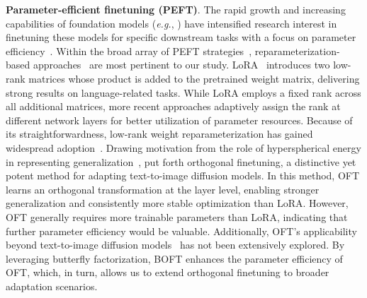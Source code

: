 \textbf{Parameter-efficient finetuning (PEFT)}. The rapid growth and increasing capabilities of foundation models (\emph{e.g.}, \cite{brown2020language,radford2021learning,rombach2022high,kirillov2023segment}) have intensified research interest in finetuning these models for specific downstream tasks with a focus on parameter efficiency~\cite{treviso2023efficient,ding2023parameter,lialin2023scaling}. Within the broad array of PEFT strategies~\cite{houlsby2019parameter,aghajanyan2020intrinsic,hulora2022,edalati2022krona,wang2022adamix,gheini2021cross,zaken2022bitfit,guo2020parameter,sung2021training,ansell2022composable,lester2021power,li2021prefix,vu2022spot,he2021towards,mao2021unipelt,karimi2021compacter,liu2022few,sung2022lst,chen2022parameter,jia2022visual,chen2022adaptformer,zhang2022neural,jie2023fact,lian2022scaling,luo2023towards}, reparameterization-based approaches~\cite{aghajanyan2020intrinsic,hulora2022,edalati2022krona} are most pertinent to our study. LoRA~\cite{hulora2022} introduces two low-rank matrices whose product is added to the pretrained weight matrix, delivering strong results on language-related tasks. While LoRA employs a fixed rank across all additional matrices, more recent approaches \cite{zhang2022adaptive,valipour2022dylora,zhang2023increlora} adaptively assign the rank at different network layers for better utilization of parameter resources. Because of its straightforwardness, low-rank weight reparameterization has gained widespread adoption~\cite{dettmers2023qlora,zi2023delta,chavan2023one}. Drawing motivation from the role of hyperspherical energy in representing generalization~\cite{liu2018learning,liu2021orthogonal}, \cite{qiu2023controlling} put forth orthogonal finetuning, a distinctive yet potent method for adapting text-to-image diffusion models. In this method, OFT learns an orthogonal transformation at the layer level, enabling stronger generalization and consistently more stable optimization than LoRA. However, OFT generally requires more trainable parameters than LoRA, indicating that further parameter efficiency would be valuable. Additionally, OFT's applicability beyond text-to-image diffusion models~\cite{qiu2023controlling} has not been extensively explored. By leveraging butterfly factorization, BOFT enhances the parameter efficiency of OFT, which, in turn, allows us to extend orthogonal finetuning to broader adaptation scenarios.

